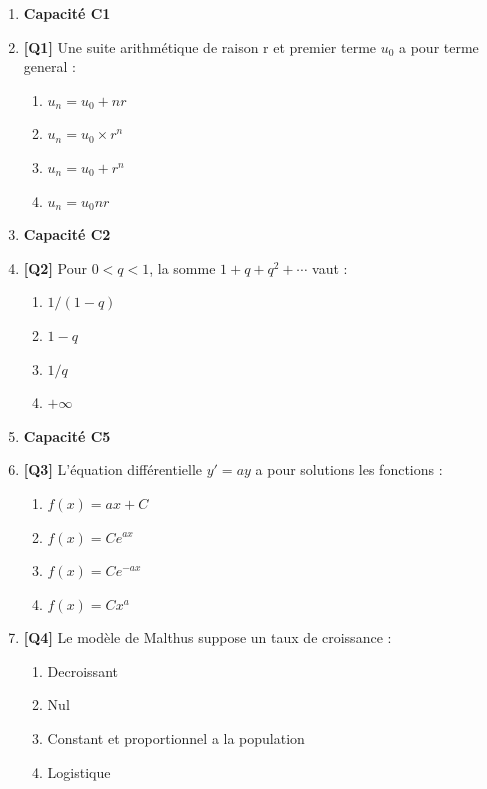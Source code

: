 \begin{enumerate}

\item[] \textbf{Capacité C1}

\item \textbf{[Q1]} Une suite arithmétique de raison r et premier terme $u_0$ a pour terme general :
  \begin{enumerate}[label=\Alph*.]
    \item $u_n = u_0 + n r$
    \item $u_n = u_0 \times r^n$
    \item $u_n = u_0 + r^n$
    \item $u_n = u_0 n r$
  \end{enumerate}

\item[] \textbf{Capacité C2}

\item \textbf{[Q2]} Pour $0<q<1$, la somme $1+q+q^2+\cdots$ vaut :
  \begin{enumerate}[label=\Alph*.]
    \item $1/(1-q)$
    \item $1-q$
    \item $1/q$
    \item $+\infty$
  \end{enumerate}

\item[] \textbf{Capacité C5}

\item \textbf{[Q3]} L'équation différentielle $y' = a y$ a pour solutions les fonctions :
  \begin{enumerate}[label=\Alph*.]
    \item $f(x) = a x + C$
    \item $f(x) = C e^{a x}$
    \item $f(x) = C e^{-a x}$
    \item $f(x) = C x^a$
  \end{enumerate}

\item \textbf{[Q4]} Le modèle de Malthus suppose un taux de croissance :
  \begin{enumerate}[label=\Alph*.]
    \item Decroissant
    \item Nul
    \item Constant et proportionnel a la population
    \item Logistique
  \end{enumerate}


\end{enumerate}
